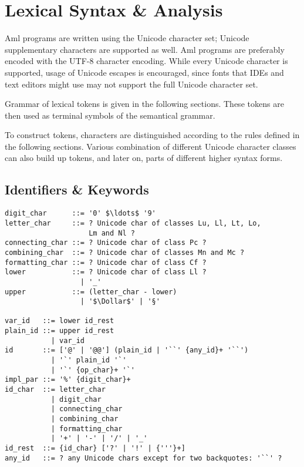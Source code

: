 
\newcommand{\Unicode}[1]{\mbox{$\backslash$u{#1}}}
\newcommand{\UnicodeRange}[2]{\mbox{$\backslash$u{#1}-$\backslash$u{#2}}}

\chapter{Lexical Syntax \& Analysis}
\label{sec:lexical-analysis}

\minitoc

Aml programs are written using the Unicode character set; Unicode supplementary characters are supported as well. Aml programs are preferably encoded with the UTF-8 character encoding. While every Unicode character is supported, usage of Unicode escapes is encouraged, since fonts that IDEs and text editors might use may not support the full Unicode character set.

Grammar of lexical tokens is given in the following sections. These tokens are then used as terminal symbols of the semantical grammar. 

To construct tokens, characters are distinguished according to the rules defined in the following sections. Various combination of different Unicode character classes can also build up tokens, and later on, parts of different higher syntax forms. 


\newpage






\section{Identifiers \& Keywords}
\label{sec:identifiers}
\label{sec:keywords}

\syntax\begin{lstlisting}[deletekeywords={of,and,class,for}]
digit_char      ::= '0' $\ldots$ '9'
letter_char     ::= ? Unicode char of classes Lu, Ll, Lt, Lo, 
                    Lm and Nl ?
connecting_char ::= ? Unicode char of class Pc ?
combining_char  ::= ? Unicode char of classes Mn and Mc ?
formatting_char ::= ? Unicode char of class Cf ?
lower           ::= ? Unicode char of class Ll ? 
                  | '_'
upper           ::= (letter_char - lower) 
                  | '$\Dollar$' | '§'

var_id   ::= lower id_rest
plain_id ::= upper id_rest
           | var_id
id       ::= ['@' | '@@'] (plain_id | '``' {any_id}+ '``')
           | '`' plain_id '`'
           | '`' {op_char}+ '`'
impl_par ::= '%' {digit_char}+
id_char  ::= letter_char
           | digit_char
           | connecting_char
           | combining_char
           | formatting_char
           | '+' | '-' | '/' | '_'
id_rest  ::= {id_char} ['?' | '!' | {'''}+]
any_id   ::= ? any Unicode chars except for two backquotes: '``' ?
\end{lstlisting}

